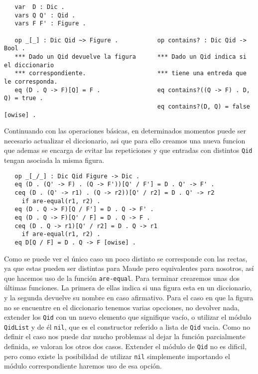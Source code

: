 {\codesize
\begin{verbatim}
   var  D : Dic .
   vars Q Q' : Qid .
   vars F F' : Figure .

   op _[_] : Dic Qid ~> Figure .           op contains? : Dic Qid -> Bool .
   *** Dado un Qid devuelve la figura      *** Dado un Qid indica si el diccionario
   *** correspondiente.                    *** tiene una entreda que le corresponda.
   eq (D . Q -> F)[Q] = F .                eq contains?((Q -> F) . D, Q) = true .
                                           eq contains?(D, Q) = false [owise] .

\end{verbatim}
}

Continuando con las operaciones básicas, en determinados momentos puede ser necesario actualizar el diccionario, asi que para ello creamos una nueva funcion que ademas se encarga de evitar las repeticiones y que entradas con distintos \texttt{Qid} tengan asociada la misma figura. \par

{\codesize
\begin{verbatim}
   op _[_/_] : Dic Qid Figure -> Dic .
   eq (D . (Q' -> F) . (Q -> F'))[Q' / F'] = D . Q' -> F' . 
   ceq (D . (Q' -> r1) . (Q -> r2))[Q' / r2] = D . Q' -> r2
     if are-equal(r1, r2) .
   eq (D . Q -> F)[Q / F'] = D . Q -> F' .
   eq (D . Q -> F)[Q' / F] = D . Q -> F .
   ceq (D . Q -> r1)[Q' / r2] = D . Q -> r1
     if are-equal(r1, r2) .   
   eq D[Q / F] = D . Q -> F [owise] .
\end{verbatim}
}

Como se puede ver el único caso un poco distinto se corresponde con las rectas, ya que estas pueden ser distintas para Maude pero equivalentes para nosotros, así que hacemos uso de la función \verb"are-equal". Para terminar crearemos unas dos últimas funciones. La primera de ellas indica si una figura esta en un diccionario, y la segunda devuelve su nombre en caso afirmativo. Para el caso en que la figura no se encuentre en el diccionario tenemos varias opcciones, no devolver nada, extender los \texttt{Qid} con un nuevo elemento que signifique vacío, o utilizar el módulo \texttt{QidList} y de él \texttt{nil}, que es el constructor referido a lista de \texttt{Qid} vacia. Como no definir el caso nos puede dar mucho problemas al dejar la función parcialmente definida, se valoran los otros dos casos. Extender el módulo de \texttt{Qid} no es dificil, pero como existe la posibilidad de utilizar \texttt{nil} simplemente importando el módulo correspondiente haremos uso de esa opción. \par

